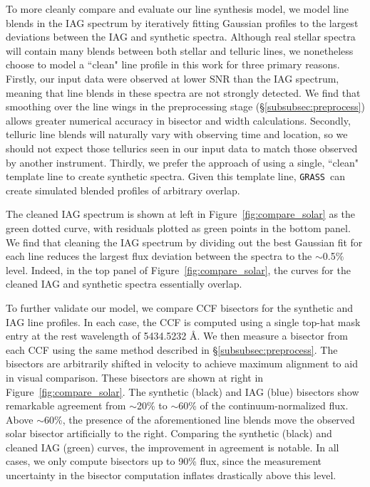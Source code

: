 \documentclass[twocolumn]{aastex63}
\newcommand{\grass}{\texttt{GRASS}}
\newcommand{\revise}[1]{#1}
\begin{document}
\revise{To more cleanly compare and evaluate our line synthesis model, we model line blends in the IAG spectrum by iteratively fitting Gaussian profiles to the largest deviations between the IAG and synthetic spectra. Although real stellar spectra will contain many blends between both stellar and telluric lines, we nonetheless choose to model a ``clean" line profile in this work for three primary reasons. Firstly, our input data were observed at lower SNR than the IAG spectrum, meaning that line blends in these spectra are not strongly detected. We find that smoothing over the line wings in the preprocessing stage (\S\ref{subsubsec:preprocess}) allows greater numerical accuracy in bisector and width calculations. Secondly, telluric line blends will naturally vary with observing time and location, so we should not expect those tellurics seen in our input data to match those observed by another instrument. Thirdly, we prefer the approach of using a single, ``clean" template line to create synthetic spectra. Given this template line, \grass\ can create simulated blended profiles of arbitrary overlap.}

The cleaned IAG spectrum is shown at left in Figure~\ref{fig:compare_solar} as the green dotted curve, with residuals plotted as green points in the bottom panel. \revise{We find that cleaning the IAG spectrum by} dividing out the best Gaussian fit for each line reduces the largest flux deviation \revise{between the spectra} to the $\sim$0.5$\%$ level. Indeed, in the top panel of Figure~\ref{fig:compare_solar}, the curves for the cleaned IAG and synthetic spectra essentially overlap. \par

To further validate our model, we compare CCF bisectors for the synthetic and IAG line profiles. In each case, the CCF is computed using a single top-hat mask entry at the rest wavelength of 5434.5232 \AA. We then measure a bisector from each CCF using the same method described in \S\ref{subsubsec:preprocess}. The bisectors are arbitrarily shifted in velocity to achieve maximum alignment to aid in visual comparison. These bisectors are shown at right in Figure~\ref{fig:compare_solar}. The synthetic (black) and IAG (blue) bisectors show remarkable agreement from $\sim$20\% to $\sim$60\% of the continuum-normalized flux. Above $\sim$60\%, the presence of the aforementioned line blends move the observed solar bisector artificially to the right. Comparing the synthetic (black) and cleaned IAG (green) curves, the improvement in agreement is notable. In all cases, we only compute bisectors up to 90\% flux, since the measurement uncertainty in the bisector computation inflates drastically above this level. \par 
\end{document}
